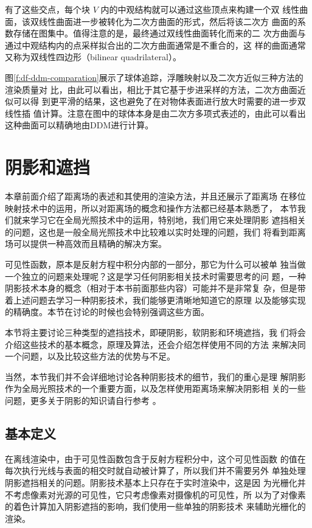 有了这些交点，每个块 $V$ 内的中观结构就可以通过这些顶点来构建一个双 线性曲面，该双线性曲面进一步被转化为二次方曲面的形式，然后将该二次方 曲面的系数存储在图集中。值得注意的是，最终通过双线性曲面转化而来的二 次方曲面与通过中观结构内的点采样拟合出的二次方曲面通常是不重合的，这 样的曲面通常又称为双线性四边形（bilinear quadrilateral）。

图\ref{f:df-ddm-comparation}展示了球体追踪，浮雕映射以及二次方近似三种方法的渲染质量对 比，由此可以看出，相比于其它基于步进采样的方法，二次方曲面近似可以得 到更平滑的结果，这也避免了在对物体表面进行放大时需要的进一步双线性插 值计算。注意在图中的球体本身是由二次方多项式表述的，由此可以看出这种曲面可以精确地由DDM进行计算。



\section{阴影和遮挡}


本章前面介绍了距离场的表述和其使用的渲染方法，并且还展示了距离场 在移位映射技术中的运用，所以对距离场的概念和操作方法都已经基本熟悉了， 本节我们就来学习它在全局光照技术中的运用，特别地，我们用它来处理阴影 遮挡相关的问题，这也是一般全局光照技术中比较难以实时处理的问题，我们 将看到距离场可以提供一种高效而且精确的解决方案。

可见性函数，原本是反射方程中积分内部的一部分，那它为什么可以被单 独当做一个独立的问题来处理呢？这是学习任何阴影相关技术时需要思考的问 题，一种阴影技术本身的概念（相对于本书前面那些内容）可能并不是非常复 杂，但是带着上述问题去学习一种阴影技术，我们能够更清晰地知道它的原理 以及能够实现的精确度。本节在讨论的时候也会特别强调这些方面。

本节将主要讨论三种类型的遮挡技术，即硬阴影，软阴影和环境遮挡，我 们将会介绍这些技术的基本概念，原理及算法，还会介绍怎样使用不同的方法 来解决同一个问题，以及比较这些方法的优势与不足。

当然，本节我们并不会详细地讨论各种阴影技术的细节，我们的重心是理 解阴影作为全局光照技术的一个重要方面，以及怎样使用距离场来解决阴影相 关的一些问题，更多关于阴影的知识请自行参考 \cite{b:rts}。




\subsection{基本定义}
在离线渲染中，由于可见性函数包含于反射方程积分中，这个可见性函数 的值在每次执行光线与表面的相交时就自动被计算了，所以我们并不需要另外 单独处理阴影遮挡相关的问题。阴影技术基本上只存在于实时渲染中，这是因 为光栅化并不考虑像素对光源的可见性，它只考虑像素对摄像机的可见性，所 以为了对像素的着色计算加入阴影遮挡的影响，我们使用一些单独的阴影技术 来辅助光栅化的渲染。

